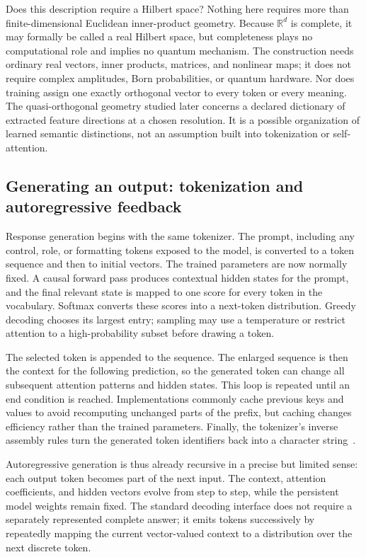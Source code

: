 \documentclass[
  aps,
  reprint,
  superscriptaddress,
  floatfix,
  nofootinbib,
  longbibliography
]{revtex4-2}
\newcommand{\R}{\mathbb{R}}
\begin{document}
Does this description require a Hilbert space?  Nothing here requires more
than finite-dimensional Euclidean inner-product geometry.  Because $\R^d$ is
complete, it may formally be called a real Hilbert space, but completeness
plays no computational role and implies no quantum mechanism.  The
construction needs ordinary real vectors, inner products, matrices, and
nonlinear maps; it does not require complex amplitudes, Born probabilities, or
quantum hardware.  Nor does training assign one exactly orthogonal vector to
every token or every meaning.  The quasi-orthogonal geometry studied later
concerns a declared dictionary of extracted feature directions at a chosen
resolution.  It is a possible organization of learned semantic distinctions,
not an assumption built into tokenization or self-attention.

\subsection{Generating an output: tokenization and autoregressive feedback}
\label{sec:prose-generation}

Response generation begins with the same tokenizer.  The prompt, including
any control, role, or formatting tokens exposed to the model, is converted to
a token sequence and then to initial vectors.  The trained parameters are now
normally fixed.  A causal forward pass produces contextual hidden states for
the prompt, and the final relevant state is mapped to one score for every
token in the vocabulary.  Softmax converts these scores into a next-token
distribution.  Greedy decoding chooses its largest entry; sampling may use a
temperature or restrict attention to a high-probability subset before drawing
a token.

The selected token is appended to the sequence.  The enlarged sequence is
then the context for the following prediction, so the generated token can
change all subsequent attention patterns and hidden states.  This loop is
repeated until an end condition is reached.  Implementations commonly cache
previous keys and values to avoid recomputing unchanged parts of the prefix,
but caching changes efficiency rather than the trained parameters.  Finally,
the tokenizer's inverse assembly rules turn the generated token identifiers
back into a character string~\cite{Brown2020May}.

Autoregressive generation is thus already recursive in a precise but limited
sense: each output token becomes part of the next input.  The context,
attention coefficients, and hidden vectors evolve from step to step, while
the persistent model weights remain fixed.  The standard decoding interface
does not require a separately represented complete answer; it emits tokens
successively by repeatedly mapping the current vector-valued context to a
distribution over the next discrete token.
\end{document}
